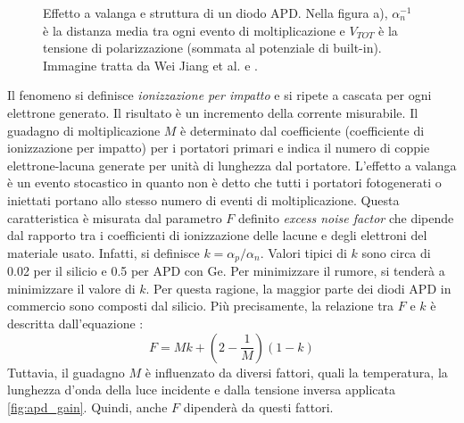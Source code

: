 \begin{figure}[tbh]
\begin{minipage}{.45\textwidth}
	\end{minipage}
	\caption{Effetto a valanga e struttura di un diodo APD. Nella figura a), $\alpha_n^{-1}$ è la distanza media tra ogni evento di moltiplicazione e $V_{TOT}$ è la tensione di polarizzazione (sommata al potenziale di built-in). Immagine tratta da Wei Jiang et al. \cite{Jiang2019} e \cite{ApdImage}.} 
	\label{fig:apd}
\end{figure}
Il fenomeno si definisce \textit{ionizzazione per impatto} e si ripete a cascata per ogni elettrone generato. Il risultato è un incremento della corrente misurabile. Il guadagno di moltiplicazione $M$ è determinato dal coefficiente \textalpha (coefficiente di ionizzazione per impatto) per i portatori primari e indica il numero di coppie elettrone-lacuna generate per unità di lunghezza \cite{Jiang2019} dal portatore.
L'effetto a valanga è un evento stocastico in quanto non è detto che tutti i portatori fotogenerati o iniettati portano allo stesso numero di eventi di moltiplicazione. Questa caratteristica è misurata dal parametro $F$ definito \textit{excess noise factor} che dipende dal rapporto tra i coefficienti di ionizzazione delle lacune e degli elettroni del materiale usato. Infatti, si definisce $k=\alpha_p / \alpha_n$. Valori tipici di $k$ sono circa di 0.02 per il silicio e 0.5 per APD con Ge. Per minimizzare il rumore, si tenderà a minimizzare il valore di $k$. Per questa ragione, la maggior parte dei diodi APD in commercio sono composti dal silicio. Più precisamente, la relazione tra $F$ e $k$ è descritta dall'equazione \cite{HAMAMATSU2021}\cite{Hossain2019}:
\begin{equation}
	F=Mk+(2-\frac{1}{M})(1-k)
\end{equation}
Tuttavia, il guadagno $M$ è influenzato da diversi fattori, quali la temperatura, la lunghezza d'onda della luce incidente e dalla tensione inversa applicata \ref{fig:apd_gain}. Quindi, anche $F$ dipenderà da questi fattori. 
